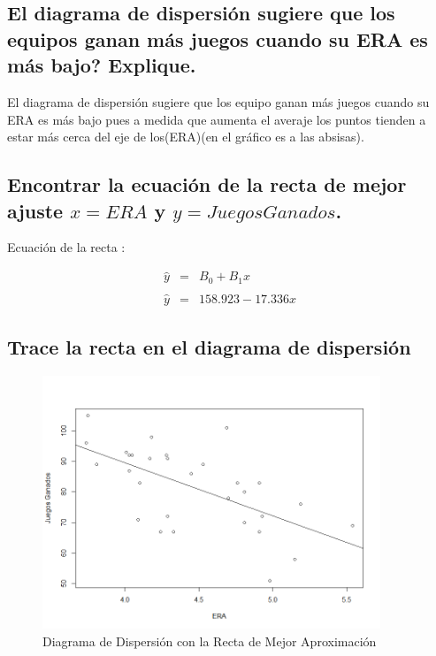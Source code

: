 \documentclass{article}
\begin{document}
		\subsection*{El diagrama de dispersión sugiere que los equipos ganan más juegos cuando su ERA es más bajo? Explique.}
			
		\begin{flushleft}
		El diagrama de dispersi\'on sugiere que los equipo ganan m\'as juegos cuando su ERA es m\'as bajo pues a medida que aumenta el averaje los puntos tienden a estar m\'as cerca del eje de los(ERA)(en el gr\'afico es a las absisas).
		\end{flushleft}
	
	

		\subsection*{Encontrar la ecuaci\'on de la recta de mejor ajuste $x = ERA$ y $y = Juegos Ganados$.}
		
		\begin{flushleft}
			Ecuaci\'on de la recta :
		\end{flushleft}
			
		\begin{equation*}
			\begin{array}{rcl}
			\hat y & = & B_{0} + B_{1}x\\\\
			\hat y & = & 158.923 - 17.336 x
			\end{array}
		\end{equation*}
		
		    
		\subsection*{Trace la recta en el diagrama de dispersi\'on }
	
		\begin{figure}[H]
			\centering
			\includegraphics[width=0.9\textwidth]{img/DiagramadeDispersionConRectadeMinimoCuadrado.png}
			\caption{Diagrama de Dispersi\'on con la Recta de Mejor Aproximaci\'on}
		\end{figure}
		
\end{document}

